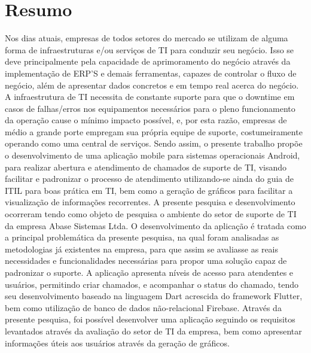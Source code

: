 \chapter*{Resumo} \label{chap:intro}
Nos dias atuais, empresas de todos setores do mercado se utilizam de alguma forma de infraestruturas e/ou serviços de TI para conduzir seu negócio. Isso se deve principalmente pela capacidade de aprimoramento do negócio através da implementação de ERP’S e demais ferramentas, capazes de controlar o fluxo de negócio, além de apresentar dados concretos e em tempo real acerca do negócio. A infraestrutura de TI necessita de constante suporte para que o downtime em casos de falhas/erros nos equipamentos necessários para o pleno funcionamento da operação cause o mínimo impacto possível, e, por esta razão, empresas de médio a grande porte empregam sua própria equipe de suporte, costumeiramente operando como uma central de serviços. Sendo assim, o presente trabalho propõe o desenvolvimento de uma aplicação mobile para sistemas operacionais Android, para realizar abertura e atendimento de chamados de suporte de TI, visando facilitar e padronizar o processo de atendimento utilizando-se ainda do guia de ITIL para boas prática em TI, bem como a geração de gráficos para facilitar a visualização de informações recorrentes. A presente pesquisa e desenvolvimento ocorreram tendo como objeto de pesquisa  o ambiente do setor de suporte de TI da empresa Abase Sistemas Ltda. O desenvolvimento da aplicação é tratada como a principal problemática da presente pesquisa, na qual foram analisadas as metodologias já existentes na empresa, para que assim se avaliasse as reais necessidades e funcionalidades necessárias para propor uma solução capaz de padronizar o suporte. A aplicação apresenta níveis de acesso para atendentes e usuários, permitindo criar chamados, e acompanhar o status do chamado, tendo seu desenvolvimento baseado na linguagem Dart acrescida do framework Flutter, bem como utilização de banco de dados não-relacional Firebase. Através da presente pesquisa, foi possível desenvolver uma aplicação seguindo os requisitos levantados através da avaliação do setor de TI da empresa, bem como apresentar informações úteis aos usuários através da geração de gráficos.
